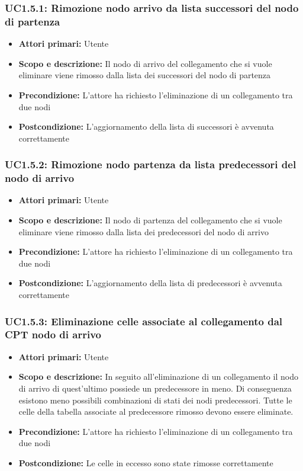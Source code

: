\subsubsection{UC1.5.1: Rimozione nodo arrivo da lista successori del nodo di partenza} 
\begin{itemize} 
	\item{\textbf{Attori primari:} Utente} 
	\item{\textbf{Scopo e descrizione:} Il nodo di arrivo del collegamento che si vuole eliminare viene rimosso dalla lista dei successori del nodo di partenza} 
	\item{\textbf{Precondizione:} L'attore ha richiesto l'eliminazione di un collegamento tra due nodi} 
	\item{\textbf{Postcondizione:} L'aggiornamento della lista di successori è avvenuta correttamente} 
\end{itemize} 
\subsubsection{UC1.5.2: Rimozione nodo partenza da lista predecessori del nodo di arrivo} 
\begin{itemize} 
	\item{\textbf{Attori primari:} Utente} 
	\item{\textbf{Scopo e descrizione:} Il nodo di partenza del collegamento che si vuole eliminare viene rimosso dalla lista dei predecessori del nodo di arrivo} 
	\item{\textbf{Precondizione:} L'attore ha richiesto l'eliminazione di un collegamento tra due nodi} 
	\item{\textbf{Postcondizione:} L'aggiornamento della lista di predecessori è avvenuta correttamente} 
\end{itemize} 
\subsubsection{UC1.5.3: Eliminazione celle associate al collegamento dal CPT nodo di arrivo} 
\begin{itemize} 
	\item{\textbf{Attori primari:} Utente} 
	\item{\textbf{Scopo e descrizione:} In seguito all'eliminazione di un collegamento il nodo di arrivo di quest'ultimo possiede un predecessore in meno. Di conseguenza esistono meno possibili combinazioni di stati dei nodi predecessori. Tutte le celle della tabella associate al predecessore rimosso devono essere eliminate.} 
	\item{\textbf{Precondizione:} L'attore ha richiesto l'eliminazione di un collegamento tra due nodi} 
	\item{\textbf{Postcondizione:} Le celle in eccesso sono state rimosse correttamente} 
\end{itemize} 
